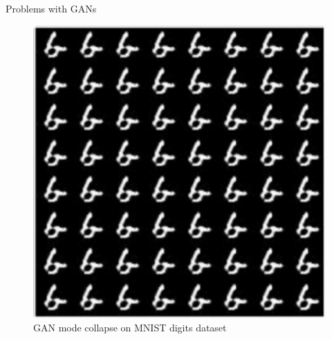 \begin{frame}[allowframebreaks]{Problems with GANs}
\framebreak
\begin{figure}
    \centering
    \includegraphics[height=0.85\textheight, width=\textwidth, keepaspectratio]{images/gan/gan_mode_collapse_2.png}
    \caption*{GAN mode collapse on MNIST digits dataset}
\end{figure}
    
\end{frame}